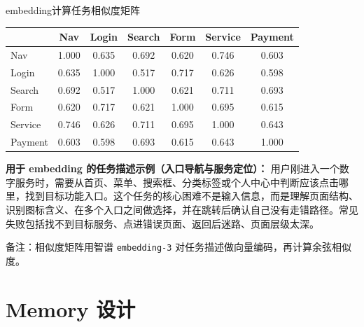 \documentclass[aspectratio=169]{beamer}
\begin{document}
\begin{frame}[t]{embedding计算任务相似度矩阵}
\scriptsize
\centering
\renewcommand{\arraystretch}{1.06}
\begin{tabular}{@{}lcccccc@{}}
\toprule
 & Nav & Login & Search & Form & Service & Payment \\
\midrule
Nav & 1.000 & 0.635 & 0.692 & 0.620 & 0.746 & 0.603 \\
Login & 0.635 & 1.000 & 0.517 & 0.717 & 0.626 & 0.598 \\
Search & 0.692 & 0.517 & 1.000 & 0.621 & 0.711 & 0.693 \\
Form & 0.620 & 0.717 & 0.621 & 1.000 & 0.695 & 0.615 \\
Service & 0.746 & 0.626 & 0.711 & 0.695 & 1.000 & 0.643 \\
Payment & 0.603 & 0.598 & 0.693 & 0.615 & 0.643 & 1.000 \\
\bottomrule
\end{tabular}

\vspace{0.14cm}
\begin{minipage}{0.94\textwidth}
\scriptsize
\justifying
\textbf{用于 embedding 的任务描述示例（入口导航与服务定位）：}
用户刚进入一个数字服务时，需要从首页、菜单、搜索框、分类标签或个人中心中判断应该点击哪里，找到目标功能入口。这个任务的核心困难不是输入信息，而是理解页面结构、识别图标含义、在多个入口之间做选择，并在跳转后确认自己没有走错路径。常见失败包括找不到目标服务、点进错误页面、返回后迷路、页面层级太深。
\end{minipage}

\vfill
{\raggedright\tiny
备注：相似度矩阵用智谱 \texttt{embedding-3} 对任务描述做向量编码，再计算余弦相似度。\par}
\vspace*{-0.12cm}
\end{frame}

\section{Memory 设计}
\end{document}
